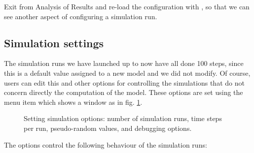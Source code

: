 \documentclass [11pt,a4paper] {book}
\begin{document}
Exit from Analysis of Results and re-load the configuration with , so that we can see
another aspect of configuring a simulation run.

\subsection{Simulation settings}
The simulation runs we have launched up to now have all done 100 steps, since this is a
default value assigned to a new model and we did not modify. Of course, users can edit
this and other options for controlling the simulations that do not concern directly the
computation of the model. These options are set using the menu item  which shows a window as in fig. \ref{fig:simset}.

\begin{figure}[ht]
  \centering
  \caption{Setting simulation options: number of simulation runs, time steps per run, pseudo-random values, and debugging options.}
  \label{fig:simset}
\end{figure}

The options control the following behaviour of the simulation runs:
\end{document}
